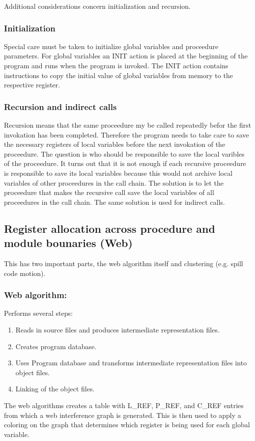 \documentclass[a4paper,10pt]{article}
\begin{document}
Additional considerations concern initialization and recursion.

\subsubsection*{Initialization}
Special care must be taken to initialize global variables and proceedure parameters. For global variables an INIT action is placed at the beginning of the program and runs when the program is invoked. The INIT action contains instructions to copy the initial value of global variables from memory to the respective register.

\subsubsection*{Recursion and indirect calls}
Recursion means that the same proceedure my be called repeatedly befor the first invokation has been completed. Therefore the program needs to take care to save the necessary registers of local variables before the next invokation of the proceedure. The question is who should be responsible to save the local varibles of the proceedure. It turns out that it is not enough if each recursive proceedure is responsible to save its local variables because this would not archive local variables of other proceedures in the call chain. The solution is to let the proceedure that makes the recursive call save the local variables of all proceedures in the call chain. The same
solution is used for indirect calls.

\subsection{Register allocation across procedure and module bounaries (Web)}
This has two important parts, the web algorithm itself and clustering (e.g. spill code motion).
\subsubsection*{Web algorithm:}
Performs several steps:
\begin{enumerate}
 \item Reads in source files and produces intermediate representation files.
 \item Creates program database.
 \item Uses Program database and transforms intermediate representation files into object files.
 \item Linking of the object files.
\end{enumerate}
The web algorithms creates a table with L\_REF, P\_REF, and C\_REF entries from which a web interference graph is generated. This is then
used to apply a coloring on the graph that determines which register is being used for each global variable.
\end{document}
